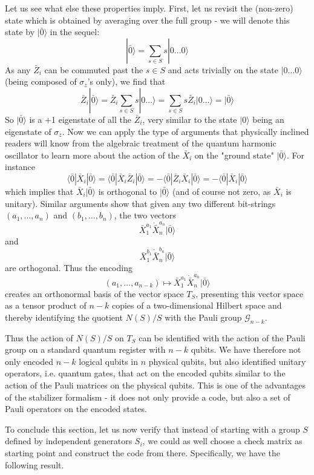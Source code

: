 \documentclass[a4paper, draft]{article}
\theoremstyle{own}
\theoremstyle{remark}
\begin{document}
Let us see what else these properties imply. First, let us revisit the (non-zero) state which is obtained by averaging over the full group - we will denote this state by $|\bar{0} \rangle$ in the sequel:
$$
|\bar{0} \rangle = \sum_{s \in S} s |0 \dots 0\rangle
$$
As any $\bar{Z}_i$ can be commuted past the $s \in S$ and acts trivially on the state $|0 \dots 0 \rangle$ (being composed of $\sigma_z$'s only), we find that 
$$
\bar{Z}_i | \bar{0} \rangle = \bar{Z}_i \sum_{s \in S} s |0 \dots \rangle = \sum_{s \in S} s \bar{Z}_i |0 \dots \rangle = | \bar{0} \rangle
$$
So $|\bar{0} \rangle$ is a +1 eigenstate of all the $\bar{Z}_i$, very similar to the state $| 0 \rangle$ being an eigenstate of $\sigma_z$. Now we can apply the type of arguments that physically inclined readers will know from the algebraic treatment of the quantum harmonic oscillator to learn more about the action of the $\bar{X}_i$ on the "ground state" $|\bar{0} \rangle$. For instance
$$
\langle \bar{0} | \bar{X}_i | \bar{0} \rangle = 
\langle \bar{0} | \bar{X}_i \bar{Z}_i | \bar{0} \rangle =
- \langle \bar{0} |  \bar{Z}_i  \bar{X}_i | \bar{0} \rangle =
- \langle \bar{0} |   \bar{X}_i | \bar{0} \rangle 
$$
which implies that $\bar{X}_i | \bar{0} \rangle$ is orthogonal to $| \bar{0} \rangle$ (and of course not zero, as $\bar{X}_i$ is unitary). Similar arguments show that given any two different bit-strings $(a_1, \dots, a_n)$ and $(b_1, \dots, b_n)$, the two vectors
$$
\bar{X}_1^{a_1} \dot \bar{X}_n^{a_n} |\bar{0} \rangle
$$
and
$$
\bar{X}_1^{b_1} \dot \bar{X}_n^{b_n} |\bar{0} \rangle
$$
are orthogonal. Thus the encoding 
$$
(a_1, \dots, a_{n-k}) \mapsto 
\bar{X}_1^{a_1} \dot \bar{X}_n^{a_n} |\bar{0} \rangle
$$
creates an orthonormal basis of the vector space $T_S$, presenting this vector space as a tensor product of $n - k$ copies of a two-dimensional Hilbert space and thereby identifying the quotient $N(S) / S$ with the Pauli group $\mathcal{G}_{n-k}$. 

Thus the action of $N(S) / S$ on $T_S$ can be identified with the action of the Pauli group on a standard quantum register with $n-k$ qubits. We have therefore not only encoded $n-k$ logical qubits in $n$ physical qubits, but also identified unitary operators, i.e. quantum gates, that act on the encoded qubits similar to the action of the Pauli matrices on the physical qubits. This is one of the advantages of the stabilizer formalism - it does not only provide a code, but also a set of Pauli operators on the encoded states. 

To conclude this section, let us now verify that instead of starting with a group $S$ defined by independent generators $S_i$, we could as well choose a check matrix as starting point and construct the code from there. Specifically, we have the following result.
\end{document}
